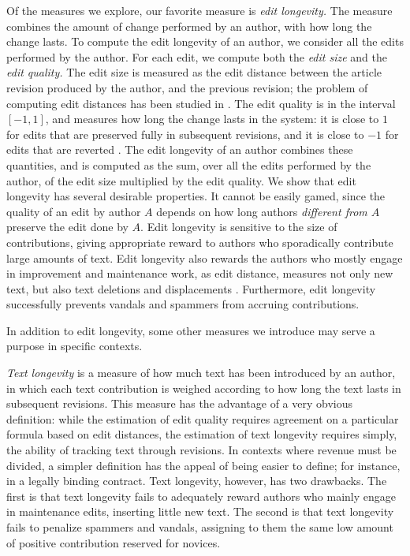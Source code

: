 Of the measures we explore, our favorite measure is {\em edit longevity.\/}
The measure combines the amount of change performed by an author, with
how long the change lasts. 
To compute the edit longevity of an author, we consider all the edits
performed by the author. 
For each edit, we compute both the {\em edit size\/} and the 
{\em edit quality.}
The edit size is measured as the edit distance between the article
revision produced by the author, and the previous revision; the
problem of computing edit distances has been studied in 
\cite{EditDist74,TichyEditDist,EditDistanceMoves}. 
The edit quality is in the interval $[-1, 1]$, and measures how long
the change lasts in the system: it is close to $1$ for edits that are
preserved fully in subsequent revisions, and it is close to $-1$ for
edits that are reverted \cite{Adler2007}. 
The edit longevity of an author combines these quantities, and is
computed as the sum, over all the edits performed by the author, of
the edit size multiplied by the edit quality. 
We show that edit longevity has several desirable properties. 
It cannot be easily gamed, since the quality of an edit by author $A$
depends on how long authors {\em different from $A$\/} preserve the
edit done by $A$. 
Edit longevity is sensitive to the size of contributions, giving
appropriate reward to authors who sporadically contribute large
amounts of text. 
Edit longevity also rewards the authors who mostly engage in
improvement and maintenance work, as edit distance, measures not only
new text, but also text deletions and displacements \cite{Adler2007}. 
Furthermore, edit longevity successfully prevents vandals and spammers
from accruing contributions. 

In addition to edit longevity, some other measures we introduce may
serve a purpose in specific contexts. 

{\em Text longevity\/} is a measure of how much text has been
introduced by an author, in which each text contribution is weighed
according to how long the text lasts in subsequent revisions. 
This measure has the advantage of a very obvious definition: while the
estimation of edit quality requires agreement on a particular formula
based on edit distances, the estimation of text longevity requires 
simply, the ability of tracking text through revisions. 
In contexts where revenue must be divided, a simpler definition has
the appeal of being easier to define; for instance, in a legally
binding contract. 
Text longevity, however, has two drawbacks. 
The first is that text longevity fails to adequately reward authors
who mainly engage in maintenance edits, inserting little new text. 
The second is that text longevity fails to penalize spammers and
vandals, assigning to them the same low amount of positive
contribution reserved for novices. 

